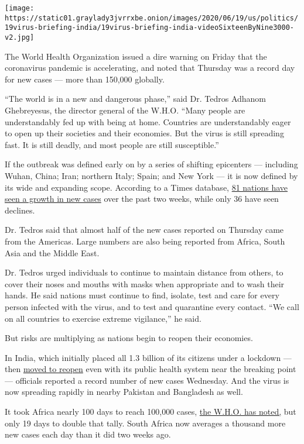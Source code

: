 \texttt{[image: https://static01.graylady3jvrrxbe.onion/images/2020/06/19/us/politics/19virus-briefing-india/19virus-briefing-india-videoSixteenByNine3000-v2.jpg]}

The World Health Organization issued a dire warning on Friday that the
coronavirus pandemic is accelerating, and noted that Thursday was a
record day for new cases --- more than 150,000 globally.

``The world is in a new and dangerous phase,'' said Dr. Tedros Adhanom
Ghebreyesus, the director general of the W.H.O. ``Many people are
understandably fed up with being at home. Countries are understandably
eager to open up their societies and their economies. But the virus is
still spreading fast. It is still deadly, and most people are still
susceptible.''

If the outbreak was defined early on by a series of shifting epicenters
--- including Wuhan, China; Iran; northern Italy; Spain; and New York
--- it is now defined by its wide and expanding scope. According to a
Times database,
\href{https://www.nytimes3xbfgragh.onion/interactive/2020/world/coronavirus-maps.html}{81
nations have seen a growth in new cases} over the past two weeks, while
only 36 have seen declines.

Dr. Tedros said that almost half of the new cases reported on Thursday
came from the Americas. Large numbers are also being reported from
Africa, South Asia and the Middle East.

Dr. Tedros urged individuals to continue to maintain distance from
others, to cover their noses and mouths with masks when appropriate and
to wash their hands. He said nations must continue to find, isolate,
test and care for every person infected with the virus, and to test and
quarantine every contact. ``We call on all countries to exercise extreme
vigilance,'' he said.

But risks are multiplying as nations begin to reopen their economies.

In India, which initially placed all 1.3 billion of its citizens under a
lockdown --- then
\href{https://www.nytimes3xbfgragh.onion/2020/06/10/world/asia/reopening-before-coronavirus-ends.html}{moved
to reopen} even with its public health system near the breaking point
--- officials reported a record number of new cases Wednesday. And the
virus is now spreading rapidly in nearby Pakistan and Bangladesh as
well.

It took Africa nearly 100 days to reach 100,000 cases,
\href{https://www.who.int/docs/default-source/coronaviruse/situation-reports/20200617-covid-19-sitrep-149.pdf?sfvrsn=3b3137b0_4}{the
W.H.O. has noted,} but only 19 days to double that tally. South Africa
now averages a thousand more new cases each day than it did two weeks
ago.

